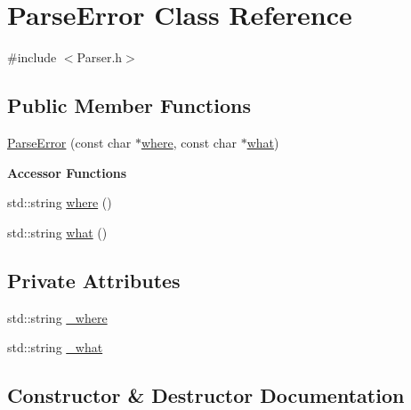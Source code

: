 \hypertarget{class_parse_error}{}\section{Parse\+Error Class Reference}
\label{class_parse_error}


{\ttfamily \#include $<$Parser.\+h$>$}

\subsection*{Public Member Functions}
\begin{DoxyCompactItemize}
\item 
\mbox{\hyperlink{class_parse_error_a89210010aa80b9602ef5e57649886937}{Parse\+Error}} (const char $\ast$\mbox{\hyperlink{class_parse_error_aa725d47c84792c9142267e51c2074f58}{where}}, const char $\ast$\mbox{\hyperlink{class_parse_error_a08560dce27779ffee6c4bfb0d796aa6e}{what}})
\end{DoxyCompactItemize}
\begin{Indent}\textbf{ Accessor Functions}\par
\begin{DoxyCompactItemize}
\item 
std\+::string \mbox{\hyperlink{class_parse_error_aa725d47c84792c9142267e51c2074f58}{where}} ()
\item 
std\+::string \mbox{\hyperlink{class_parse_error_a08560dce27779ffee6c4bfb0d796aa6e}{what}} ()
\end{DoxyCompactItemize}
\end{Indent}
\subsection*{Private Attributes}
\begin{DoxyCompactItemize}
\item 
std\+::string \mbox{\hyperlink{class_parse_error_a3a27d02d5a9f461858cefd653a2c4598}{\+\_\+where}}
\item 
std\+::string \mbox{\hyperlink{class_parse_error_a72a23d010120721cde37f0e3203ef12b}{\+\_\+what}}
\end{DoxyCompactItemize}


\subsection{Constructor \& Destructor Documentation}
\mbox{\label{class_parse_error_a89210010aa80b9602ef5e57649886937}} 
